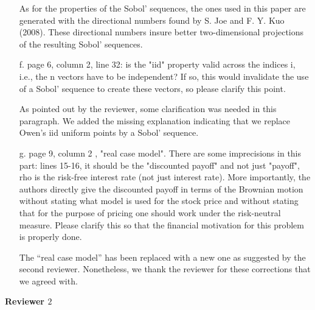 \documentclass[10pt,a4paper]{article}
\newcommand{\answer}[1]{{\color{blue} #1 }}
\begin{document}
\begin{itemize}
{As for the properties of the Sobol' sequences, the ones used in this paper are generated with the directional numbers found by S. Joe and F. Y. Kuo (2008). These directional numbers insure better two-dimensional projections of the resulting Sobol' sequences.}

\item[f.] page 6, column 2, line 32: is the "iid" property valid across the indices i, i.e., the n vectors have to be independent? If so, this would invalidate the use of a Sobol' sequence to create these vectors, so please clarify this point.

\answer{As pointed out by the reviewer, some clarification was needed in this paragraph. We added the missing explanation indicating that we replace Owen's iid uniform points by a Sobol' sequence.}

\item[g.] page 9, column 2 , "real case model". There are some imprecisions in this part: lines 15-16, it should be the "discounted payoff" and not just "payoff", rho is the risk-free interest rate (not just interest rate). More importantly, the authors directly give the discounted payoff in terms of the Brownian motion without stating what model is used for the stock price and without stating that for the purpose of pricing one should work under the risk-neutral measure. Please clarify this so that the financial motivation for this problem is properly done.

{\color{blue} The ``real case model'' has been replaced with a new one as suggested by the second reviewer. Nonetheless, we thank the reviewer for these corrections that we agreed with.} 
\end{itemize}

\textbf{\large{Reviewer $2$}}
\vspace*{0.5cm}
\end{document}
